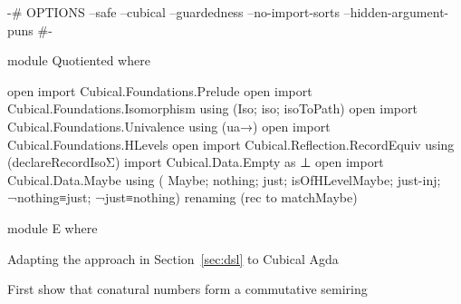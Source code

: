 \begin{code}[hide]
{-# OPTIONS
  --safe
  --cubical
  --guardedness
  --no-import-sorts
  --hidden-argument-puns #-}

module Quotiented where

open import Cubical.Foundations.Prelude
open import Cubical.Foundations.Isomorphism using (Iso; iso; isoToPath)
open import Cubical.Foundations.Univalence using (ua→)
open import Cubical.Foundations.HLevels
open import Cubical.Reflection.RecordEquiv using (declareRecordIsoΣ)
import Cubical.Data.Empty as ⊥
open import Cubical.Data.Maybe
  using
    ( Maybe; nothing; just;
      isOfHLevelMaybe; just-inj; ¬nothing≡just; ¬just≡nothing)
  renaming (rec to matchMaybe)

module E where
\end{code}
Adapting the approach in Section~\ref{sec:dsl} to Cubical Agda

First show that conatural numbers form a commutative semiring

